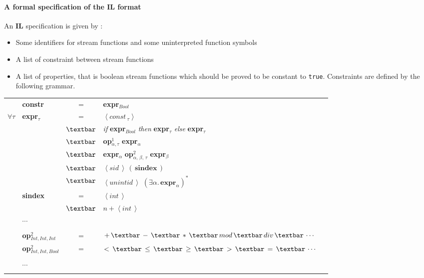 \paragraph{A formal specification of the IL format} 


An \textbf{IL} specification is given by :
\begin{itemize}
\item Some identifiers for stream functions and some uninterpreted function symbols
\item A list of constraint between stream functions
\item A list of properties, that is boolean stream functions which should be proved to be constant to \texttt{true}.
Constraints are defined by the following grammar.
\end{itemize}

\bigskip

\begin{tabular}{llclr}
& \textbf{constr} & = & \textbf{expr}$_{Bool}$ & \\
$\forall \tau$ & \textbf{expr}$_{\tau}$ & = & $\left< \textit{const}\,_\tau  \right>$ &\\
& & $\textbar$ & \textit{if} \textbf{expr}$_{Bool}$ \textit{then} \textbf{expr}$_{\tau}$ \textit{else} \textbf{expr}$_{\tau}$ \\

& & $\textbar$ &\textbf{op}$^1_{\alpha, \tau}$ \textbf{expr}$_{\alpha}$ \\
& & $\textbar$ & \textbf{expr}$_{\alpha}$ \textbf{op}$^2_{\alpha, \, \beta, \, \tau}$ \textbf{expr}$_{\beta}$ \\
& & $\textbar$ & $\left< \textit{sid} \,  \right> \, \left(\,\textbf{sindex}\,\right)$ \\
& & $\textbar$ & $\left< \textit{unintid} \,  \right> $ $\left(  \exists \alpha . \, \textbf{expr}_\alpha \right)^{*}$
\\
& \textbf{sindex} & = & $\left< \textit{int} \,  \right> $ & \\
& & $\textbar$ & $ \textit{n} +  \left< \textit{int} \,  \right> $ & \\


& $\cdots$ & & \\
&&& \\

& \textbf{op}$^2_{Int, Int, Int}$ & = & $+ \,\textbar \, - \,\textbar\, *  \,\textbar\, mod  \,\textbar\, div  \,\textbar\, \cdots $ & \\
& \textbf{op}$^2_{Int, Int, Bool}$ & = & $< \,\textbar \, \leq \,\textbar\, \geq \,\textbar\, >  \,\textbar\, =  \,\textbar\, \cdots $ & \\
&&& \\
& $\cdots$ & & \\
&&& \\
\end{tabular}

